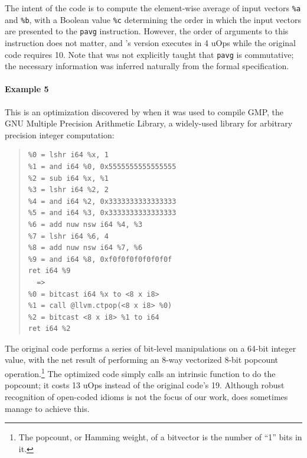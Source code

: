 The intent of the code is to compute the element-wise average of input
vectors \texttt{\%a} and \texttt{\%b}, with a Boolean value
\texttt{\%c} determining the order in which the input vectors are
presented to the \texttt{pavg} instruction.
%
However, the order of arguments to this instruction does not matter, and
\minotaur's version executes in 4 uOps while the original code requires
10.
%
Note that \minotaur{} was not explicitly taught that \texttt{pavg} is
commutative; the necessary information was inferred naturally from the
formal specification.


\paragraph*{Example 5}

This is an optimization discovered
by \minotaur{} when it was used to compile GMP, the GNU Multiple Precision
Arithmetic Library, a widely-used library for arbitrary precision
integer computation:


{\small\begin{quote}\begin{verbatim}
%0 = lshr i64 %x, 1
%1 = and i64 %0, 0x5555555555555555
%2 = sub i64 %x, %1
%3 = lshr i64 %2, 2
%4 = and i64 %2, 0x3333333333333333
%5 = and i64 %3, 0x3333333333333333
%6 = add nuw nsw i64 %4, %3
%7 = lshr i64 %6, 4
%8 = add nuw nsw i64 %7, %6
%9 = and i64 %8, 0xf0f0f0f0f0f0f0f
ret i64 %9
  =>
%0 = bitcast i64 %x to <8 x i8>
%1 = call @llvm.ctpop(<8 x i8> %0)
%2 = bitcast <8 x i8> %1 to i64
ret i64 %2
\end{verbatim}
\end{quote}}

%
%
The original code performs a series of bit-level
manipulations on a 64-bit integer value, with the net result of
performing an 8-way vectorized 8-bit popcount operation.\footnote{The
popcount, or Hamming weight, of a bitvector is the number of ``1''
bits in it.}
%
The optimized code simply calls an intrinsic function to do the
popcount; it costs 13 uOps instead of the original code's 19.
%
Although robust recognition of open-coded idioms is not the focus
of our work, \minotaur{} does sometimes manage to achieve this.

